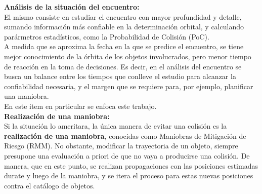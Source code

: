 {\bf{An\'alisis de la situaci\'on del encuentro: }}\\
El mismo consiste en estudiar el encuentro con mayor profundidad y detalle, sumando informaci\'on m\'as confiable en la determinaci\'on orbital, y calculando par\'armetros estad\'isticos, como la Probabilidad de Colisi\'on (PoC).\\
A medida que se aproxima la fecha en la que se predice el encuentro, se tiene mejor conocimiento de la \'orbita de los objetos involucrados, pero menor tiempo de reacci\'on en la toma de decisiones. Es decir, en el an\'alisis del encuentro se busca un balance entre los tiempos que conlleve el estudio para alcanzar la confiabilidad necesaria, y el margen que se requiere para, por ejemplo, planificar una maniobra.\\
En este item en particular se enfoca este trabajo.\\

{\bf{Realizaci\'on de una maniobra:}}\\
Si la situaci\'on lo ameritara, la \'unica manera de evitar una colisi\'on es la {\bf{realizaci\'on de una maniobra}}, conocidas como Maniobras de Mitigaci\'on de Riesgo (RMM). No obstante, modificar la trayectoria de un objeto, siempre presupone una evaluaci\'on a priori de que no vaya a producirse una colisi\'on. De manera, que en este punto, se realizan propagaciones con las posiciones estimadas durate y luego de la maniobra, y se itera el proceso para estas nuevas posiciones contra el cat\'alogo de objetos.\\ 






